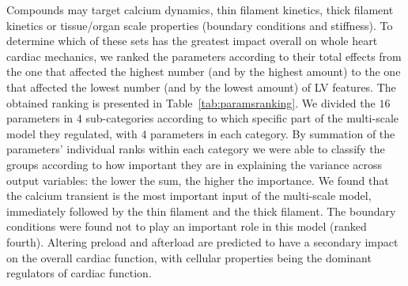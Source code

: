 \vspace{0.2cm}
Compounds may target calcium dynamics, thin filament kinetics, thick filament kinetics or tissue/organ scale properties (boundary conditions and stiffness). To determine which of these sets has the greatest impact overall on whole heart cardiac mechanics, we ranked the parameters according to their total effects from the one that affected the highest number (and by the highest amount) to the one that affected the lowest number (and by the lowest amount) of LV features. The obtained ranking is presented in Table~\ref{tab:paramsranking}. We divided the $16$ parameters in $4$ sub-categories according to which specific part of the multi-scale model they regulated, with $4$ parameters in each category. By summation of the parameters' individual ranks within each category we were able to classify the groups according to how important they are in explaining the variance across output variables: the lower the sum, the higher the importance. We found that the calcium transient is the most important input of the multi-scale model, immediately followed by the thin filament and the thick filament. The boundary conditions were found not to play an important role in this model (ranked fourth). Altering preload and afterload are predicted to have a secondary impact on the overall cardiac function, with cellular properties being the dominant regulators of cardiac function.

